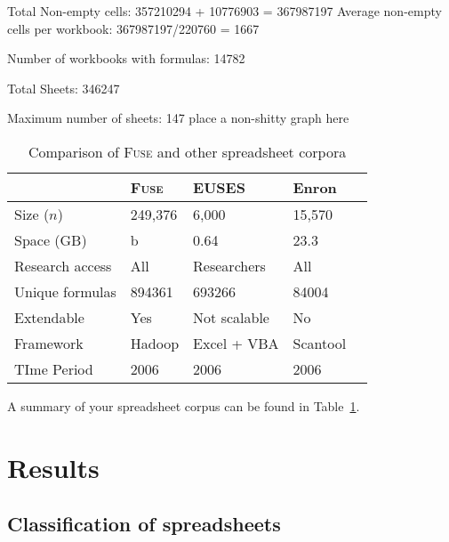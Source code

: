 \documentclass[conference]{IEEEtran}
\begin{document}
Total Non-empty cells: 357210294 + 10776903 = 367987197
Average non-empty cells per workbook: 367987197/220760 = 1667

Number of workbooks with formulas: 14782

Total Sheets: 346247

Maximum number of sheets: 147
place a non-shitty graph here

\begin{table}[!t]
\caption{Comparison of \textsc{Fuse} and other spreadsheet corpora\label{tab:corpora}}
\centering
\begin{tabular}{lllll}
\toprule
& \textbf{\textsc{Fuse}} & \textbf{EUSES} & \textbf{Enron}\\
\midrule
Size ($n$) & 249,376 & 6,000 & 15,570\\
Space (GB) & b & 0.64 & 23.3\\
Research access & All & Researchers & All\\
Unique formulas & 894361 & 693266 & 84004\\
Extendable & Yes & Not scalable & No\\
Framework & Hadoop & Excel + VBA & Scantool\\
TIme Period & 2006 & 2006 & 2006\\
\bottomrule
\end{tabular}
\end{table}

A summary of your spreadsheet corpus can be found in Table~\ref{tab:corpora}.

\section{Results}

\subsection{Classification of spreadsheets}
\end{document}

